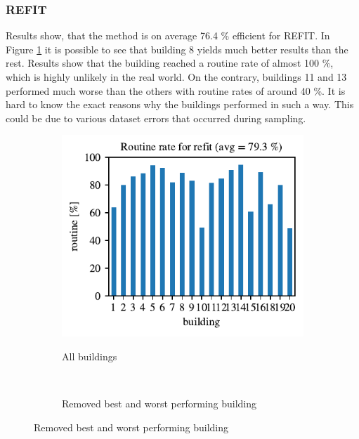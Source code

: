 \subsubsection{REFIT}

Results show, that the method is on average 76.4 \% efficient for REFIT.  
In Figure \ref{fig:refit_res} it is possible to see that building 8 yields much better results than the rest.
Results show that the building reached a routine rate of almost 100 \%, which is highly unlikely in the real world. 
On the contrary, buildings 11 and 13 performed much worse than the others with routine rates of around 40 \%.
It is hard to know the exact reasons why the buildings performed in such a way.
This could be due to various dataset errors that occurred during sampling.


\begin{figure}[H]
	\begin{subfigure}{.5\textwidth}
        \caption{All buildings}
        \includegraphics[width=1\textwidth]{Figures/EC/refit_res.pdf}
        \label{fig:refit_res}
    \end{subfigure}
    ~
    \begin{subfigure}{.5\textwidth}
        \caption{Removed best and worst performing building}

\end{subfigure}
\end{figure}
